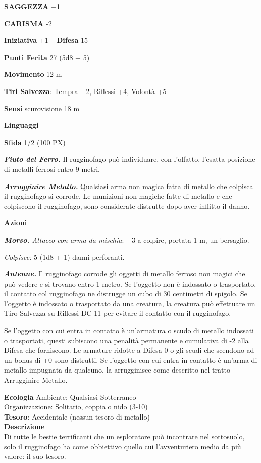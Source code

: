 \begin{multicols}{2}
	\textbf{SAGGEZZA} +1

	\textbf{CARISMA} -2

	\textbf{Iniziativa} +1 -- \textbf{Difesa} 15

	\textbf{Punti Ferita} 27 (5d8 + 5)

	\textbf{Movimento} 12 m

	\textbf{Tiri Salvezza}: Tempra +2, Riflessi +4, Volontà +5

	\textbf{Sensi} scurovisione 18 m

	\textbf{Linguaggi} -

	\textbf{Sfida} 1/2 (100 PX)

	\textit{\textbf{Fiuto del Ferro.}} Il rugginofago può individuare, con l'olfatto, l'esatta posizione di metalli ferrosi entro 9 metri.

	\textit{\textbf{Arrugginire Metallo.}} Qualsiasi arma non magica fatta di metallo che colpisca il rugginofago si corrode. Le munizioni non magiche fatte di metallo e che colpiscono il rugginofago, sono considerate distrutte dopo aver inflitto il danno.

	\textbf{Azioni}

	\textit{\textbf{Morso.} Attacco con arma da mischia}: +3 a colpire, portata 1 m, un bersaglio.

	\textit{Colpisce:} 5 (1d8 + 1) danni perforanti.

	\textit{\textbf{Antenne.}} Il rugginofago corrode gli oggetti di metallo ferroso non magici che può vedere e si trovano entro 1 metro. Se l'oggetto non è indossato o trasportato, il contatto col rugginofago ne distrugge un cubo di 30 centimetri di spigolo. Se l'oggetto è indossato o trasportato da una creatura, la creatura può effettuare un Tiro Salvezza su Riflessi DC 11 per evitare il contatto con il rugginofago.

	Se l'oggetto con cui entra in contatto è un'armatura o scudo di metallo indossati o trasportati, questi subiscono una penalità permanente e cumulativa di -2 alla Difesa che forniscono. Le armature ridotte a Difesa 0 o gli scudi che scendono ad un bonus di +0 sono distrutti. Se l'oggetto con cui entra in contatto è un'arma di metallo impugnata da qualcuno, la arrugginisce come descritto nel tratto Arrugginire Metallo.

	\textbf{Ecologia}
	Ambiente: Qualsiasi Sotterraneo\\
	Organizzazione: Solitario, coppia o nido (3-10)\\
	\textbf{Tesoro}: Accidentale (nessun tesoro di metallo)\\
	\textbf{Descrizione}\\
	Di tutte le bestie terrificanti che un esploratore può incontrare nel sottosuolo, solo il rugginofago ha come obbiettivo quello cui l'avventuriero medio da più valore: il suo tesoro.


\end{multicols}
